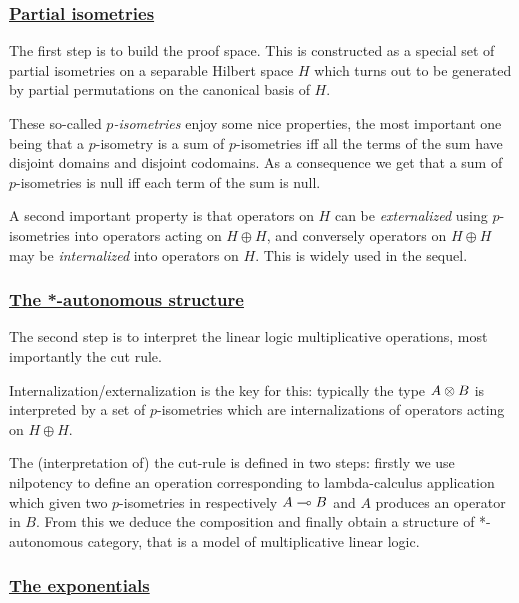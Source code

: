 \subsubsection{\texorpdfstring{\href{GoI_for_MELL:_partial_isometries}{Partial isometries}}{Partial isometries}}\label{partial-isometries}

The first step is to build the proof space. This is constructed as a
special set of partial isometries on a separable Hilbert space \(H\)
which turns out to be generated by partial permutations on the canonical
basis of \(H\).

These so-called \emph{\(p\)-isometries} enjoy some nice properties, the
most important one being that a \(p\)-isometry is a sum of
\(p\)-isometries iff all the terms of the sum have disjoint domains and
disjoint codomains. As a consequence we get that a sum of
\(p\)-isometries is null iff each term of the sum is null.

A second important property is that operators on \(H\) can be
\emph{externalized} using \(p\)-isometries into operators acting on
\(H\oplus H\), and conversely operators on \(H\oplus H\) may be
\emph{internalized} into operators on \(H\). This is widely used in the
sequel.

\subsubsection{\texorpdfstring{\href{GoI_for_MELL:_the_*-autonomous_structure}{The *-autonomous structure}}{The *-autonomous structure}}\label{the--autonomous-structure}

The second step is to interpret the linear logic multiplicative
operations, most importantly the cut rule.

Internalization/externalization is the key for this: typically the type
\(A\otimes B\) is interpreted by a set of \(p\)-isometries which are
internalizations of operators acting on \(H\oplus H\).

The (interpretation of) the cut-rule is defined in two steps: firstly we
use nilpotency to define an operation corresponding to lambda-calculus
application which given two \(p\)-isometries in respectively
\(A\multimap B\) and \(A\) produces an operator in \(B\). From this we
deduce the composition and finally obtain a structure of *-autonomous
category, that is a model of multiplicative linear logic.

\subsubsection{\texorpdfstring{\href{GoI_for_MELL:_exponentials}{The exponentials}}{The exponentials}}\label{the-exponentials}

